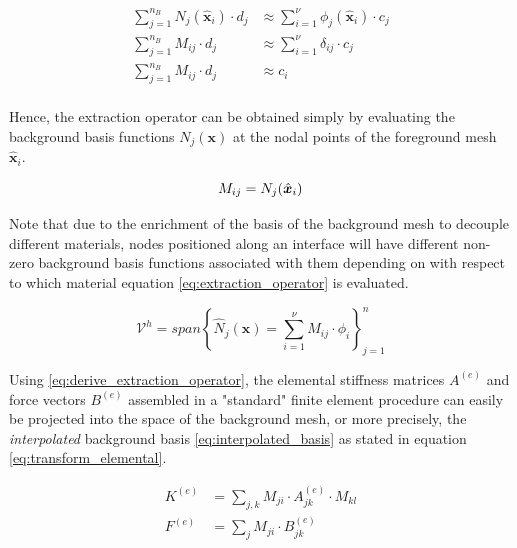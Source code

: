 \begin{equation}
    \label{eq:derive_extraction_operator}
    \begin{split}
        \sum_{j=1}^{n_B} N_j(\hat{\bm{x}}_i) \cdot d_j 
        &\approx \sum_{i=1}^{\nu} \phi_j(\hat{\bm{x}}_i) \cdot c_j \\
        \sum_{j=1}^{n_B} M_{ij} \cdot d_j 
        &\approx \sum_{i=1}^{\nu} \delta_{ij} \cdot c_j \\
        \sum_{j=1}^{n_B} M_{ij} \cdot d_j 
        &\approx c_i \\
    \end{split}
\end{equation}

Hence, the extraction operator can be obtained simply by evaluating the background basis functions $N_j(\bm{x})$ at the nodal points of the foreground mesh $\hat{\bm{x}}_i$.

\begin{equation}
\label{eq:extraction_operator}
    M_{ij} =  N_j(\hat{\bm{x}}_i)\\
\end{equation}

Note that due to the enrichment of the basis of the background mesh to decouple different materials, nodes positioned along an interface will have different non-zero background basis functions associated with them depending on with respect to which material equation \eqref{eq:extraction_operator} is evaluated.  

\begin{equation}
\label{eq:interpolated_basis}
    \mathcal{V}^h = span\left\{ 
        \widehat{N}_j(\bm{x}) = \sum_{i=1}^{\nu} M_{ij} \cdot \phi_i
    \right\}_{j=1}^{n}
\end{equation}

Using \eqref{eq:derive_extraction_operator}, the elemental stiffness matrices $A^{(e)}$ and force vectors $B^{(e)}$ assembled in a "standard" finite element procedure can easily be projected into the space of the background mesh, or more precisely, the \emph{interpolated} background basis \eqref{eq:interpolated_basis} as stated in equation \eqref{eq:transform_elemental}.

\begin{equation}
    \label{eq:transform_elemental}
    \begin{split}
        K^{(e)} &= \sum_{j,k} M_{ji} \cdot A^{(e)}_{jk} \cdot M_{kl} \\
        F^{(e)} &= \sum_{j} M_{ji} \cdot B^{(e)}_{jk}  \\
    \end{split}
\end{equation}